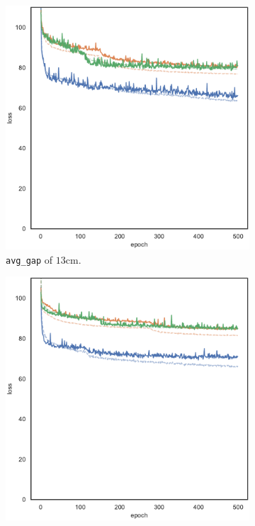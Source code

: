 \begin{figure}[!htb]
\begin{center}
\begin{subfigure}[h]{0.32\textwidth}
			\includegraphics[width=\textwidth]{contents/images/task1-comm-extension/loss-communication-gap_20@copy}%
			\caption{\texttt{avg\_gap} of $13$\gls{cm}.}
		\end{subfigure}
		\hfill
		\begin{subfigure}[h]{0.32\textwidth}
			\includegraphics[width=\textwidth]{contents/images/task1-comm-extension/loss-communication-gap_var@copy}

\end{subfigure}
\end{center}
\end{figure}
